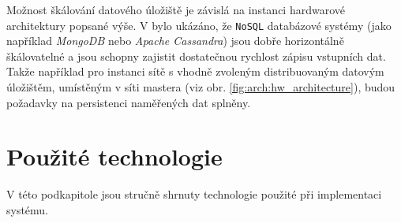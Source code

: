Možnost škálování datového úložiště je závislá na instanci hardwarové architektury popsané výše. V \cite{gandini2014performance} bylo ukázáno, že \texttt{NoSQL} databázové systémy (jako například \textit{MongoDB} nebo \textit{Apache Cassandra}) jsou dobře horizontálně škálovatelné a jsou schopny zajistit dostatečnou rychlost zápisu vstupních dat. Takže například pro instanci sítě s vhodně zvoleným distribuovaným datovým úložištěm, umístěným v síti mastera (viz obr. \ref{fig:arch:hw_architecture}), budou požadavky na persistenci naměřených dat splněny.

\section{Použité technologie}\label{chap:arch:technologie}
V této podkapitole jsou stručně shrnuty technologie použité při implementaci systému.

